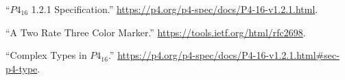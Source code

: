 \documentclass[11pt]{article}
\begin{document}
{%
{%
\begin{thebibliography}{39}%
\label{sec-bibliography}%

\mdbibitemlabel{{}[1]}\textquotedblleft{}$P4_{16}$ 1.2.1 Specification.\textquotedblright{} \href{https://p4.org/p4-spec/docs/P4-16-v1.2.1.html}{{\ttfamily https://\hspace{0pt}p4.\hspace{0pt}org/\hspace{0pt}p4-\hspace{0pt}spec/\hspace{0pt}docs/\hspace{0pt}P4-\hspace{0pt}16-\hspace{0pt}v1.\hspace{0pt}2.\hspace{0pt}1.\hspace{0pt}html}}.\label{p4spec}%

\mdbibitemlabel{{}[2]}\textquotedblleft{}A Two Rate Three Color Marker.\textquotedblright{} \href{https://tools.ietf.org/html/rfc2698}{{\ttfamily https://\hspace{0pt}tools.\hspace{0pt}ietf.\hspace{0pt}org/\hspace{0pt}html/\hspace{0pt}rfc2698}}.\label{rfc2698}%

\mdbibitemlabel{{}[3]}\textquotedblleft{}Complex Types in $P4_{16}$.\textquotedblright{} \href{https://p4.org/p4-spec/docs/P4-16-v1.2.1.html\%23sec-p4-type}{{\ttfamily https://\hspace{0pt}p4.\hspace{0pt}org/\hspace{0pt}p4-\hspace{0pt}spec/\hspace{0pt}docs/\hspace{0pt}P4-\hspace{0pt}16-\hspace{0pt}v1.\hspace{0pt}2.\hspace{0pt}1.\hspace{0pt}html\#\hspace{0pt}sec-\hspace{0pt}p4-\hspace{0pt}type}}.\label{p4complextypes}%


\end{thebibliography}}}
\end{document}
